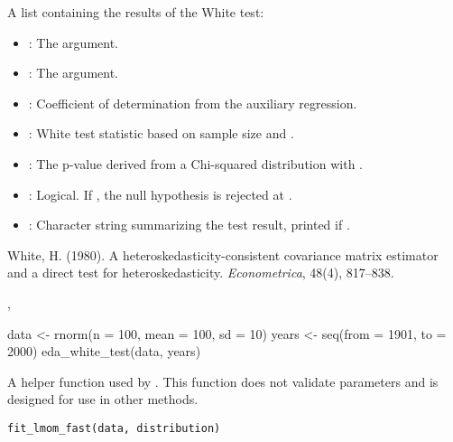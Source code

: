 \documentclass[a4paper]{book}
\begin{document}
\begin{Value}
A list containing the results of the White test:
\begin{itemize}

\item{} : The  argument.
\item{} : The  argument.
\item{} : Coefficient of determination from the auxiliary regression.
\item{} : White test statistic based on sample size and .
\item{} : The p-value derived from a Chi-squared distribution with .
\item{} : Logical. If , the null hypothesis is rejected at .
\item{} : Character string summarizing the test result, printed if .

\end{itemize}

\end{Value}
%
\begin{References}
White, H. (1980). A heteroskedasticity-consistent covariance matrix estimator and
a direct test for heteroskedasticity. \emph{Econometrica}, 48(4), 817–838.
\end{References}
%
\begin{SeeAlso}
, 
\end{SeeAlso}
%
\begin{Examples}
\begin{ExampleCode}
data <- rnorm(n = 100, mean = 100, sd = 10)
years <- seq(from = 1901, to = 2000)
eda_white_test(data, years)

\end{ExampleCode}
\end{Examples}
%
\begin{Description}
A helper function used by .
This function does not validate parameters and is designed for use in other methods.
\end{Description}
%
\begin{Usage}
\begin{verbatim}
fit_lmom_fast(data, distribution)
\end{verbatim}
\end{Usage}
\end{document}
